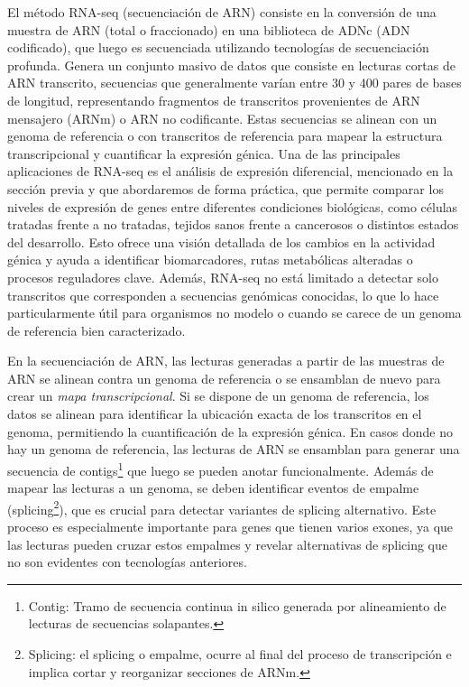 El método RNA-seq (secuenciación de ARN) consiste en la conversión de una muestra de ARN (total o fraccionado) en una biblioteca de ADNc 
(ADN codificado), que luego es secuenciada utilizando tecnologías de secuenciación profunda. Genera un conjunto masivo de datos que consiste 
en lecturas cortas de ARN transcrito, secuencias que generalmente varían entre 30 y 400 pares de bases de longitud, representando fragmentos 
de transcritos provenientes de ARN mensajero (ARNm) o ARN no codificante. Estas secuencias se alinean con un genoma de referencia o con 
transcritos de referencia para mapear la estructura transcripcional y cuantificar la expresión génica. Una de las principales aplicaciones 
de RNA-seq es el análisis de expresión diferencial, mencionado en la sección previa y que abordaremos de forma práctica, que permite comparar 
los niveles de expresión de genes entre diferentes condiciones 
biológicas, como células tratadas frente a no tratadas, tejidos sanos frente a cancerosos o distintos estados del desarrollo. Esto ofrece 
una visión detallada de los cambios en la actividad génica y ayuda a identificar biomarcadores, rutas metabólicas alteradas o procesos 
reguladores clave. Además, RNA-seq no está limitado a detectar solo transcritos que corresponden a secuencias genómicas conocidas, 
lo que lo hace particularmente útil para organismos no modelo o cuando se carece de un genoma de referencia bien caracterizado\cite{transcriptomics-2-RNA-seq}.\newline

En la secuenciación de ARN, las lecturas generadas a partir de las muestras de ARN se alinean contra un genoma de referencia o se ensamblan de
nuevo para crear un \textit{mapa transcripcional}. Si se dispone de un genoma de referencia, los datos se alinean para identificar la ubicación exacta de
los transcritos en el genoma, permitiendo la cuantificación de la expresión génica. En casos donde no hay un genoma de referencia, las lecturas 
de ARN se ensamblan para generar una secuencia de contigs\footnote[3]{Contig: Tramo de secuencia continua in silico generada por alineamiento 
de lecturas de secuencias solapantes\cite{contig-definition}.} que luego se pueden anotar funcionalmente. Además de mapear las lecturas a un genoma, 
se deben identificar eventos de empalme (splicing\footnote[4]{Splicing: el splicing o empalme, ocurre al final del proceso de transcripción e 
implica cortar y reorganizar secciones de ARNm\cite{splicing-definition}.}), que es crucial para detectar variantes de splicing alternativo. Este proceso es especialmente 
importante para genes que tienen varios exones, ya que las lecturas pueden cruzar estos empalmes y revelar alternativas de splicing que no son 
evidentes con tecnologías anteriores\cite{transcriptomics-2-RNA-seq-2}. \newline %

